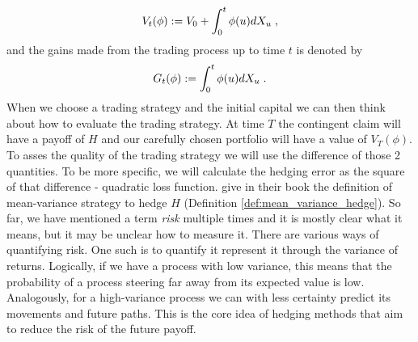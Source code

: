 \documentclass[times, utf8, diplomski]{fer}
\begin{document}
\begin{equation}
	V_t(\phi) := V_0 + \int_0^t \phi(u) dX_u \hspace{0.1cm},
\end{equation} 
and the gains made from the trading process up to time $t$ is denoted by 
\begin{equation} 
	G_t(\phi) := \int_0^t \phi(u)dX_u \hspace{0.1cm}.
\end{equation} 
When we choose a trading strategy and the initial capital we can then think about how to evaluate the trading strategy. At time $T$ the contingent claim will have a payoff of $H$ and our carefully chosen portfolio will have a value of $V_T(\phi)$. To asses the quality of the trading strategy we will use the difference of those 2 quantities. To be more specific, we will calculate the hedging error as the square of that difference - quadratic loss function. \cite{bingham_risk-neutral_2004} give in their book the definition of mean-variance strategy to hedge $H$ (Definition \ref{def:mean_variance_hedge}). So far, we have mentioned a term \textit{risk} multiple times and it is mostly clear what it means, but it may be unclear how to measure it. There are various ways of quantifying risk. One such is to quantify it represent it through the variance of returns. Logically, if we have a process with low variance, this means that the probability of a process steering far away from its expected value is low. Analogously, for a high-variance process we can with less certainty predict its movements and future paths. This is the core idea of hedging methods that aim to reduce the risk of the future payoff.
\end{document}
